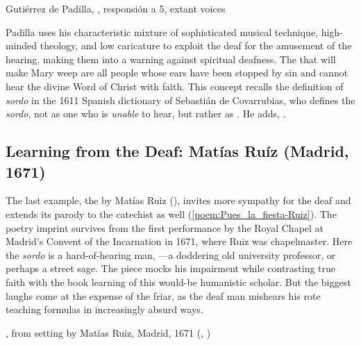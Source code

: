 \begin{musicexample}
    \caption{Gutiérrez de Padilla, ,
    responsión a 5, extant voices}

    \label{music:Padilla-Sordo-responsion}

\end{musicexample}

Padilla uses his characteristic mixture of sophisticated musical technique,
high-minded theology, and low caricature to exploit the deaf for the amusement
of the hearing, making them into a warning against spiritual deafness.
The  that will make Mary weep are all people whose ears have
been stopped by sin and cannot hear the divine Word of Christ with faith.
This concept recalls the definition of \emph{sordo} in the 1611 Spanish
dictionary of Sebastián de Covarrubias, who defines the \emph{sordo}, not as one
who is \emph{unable} to hear, but rather as .
He adds, .%
    \Autocite
    [: .] 
    {Covarrubias:Tesoro}


\subsection{Learning from the Deaf: Matías Ruíz (Madrid, 1671)}

The last example, the  by Matías Ruiz
(), invites more sympathy for the deaf and extends its
parody to the catechist as well (\cref{poem:Pues_la_fiesta-Ruiz}).
The poetry imprint survives from the first performance by the Royal Chapel at
Madrid's Convent of the Incarnation in 1671, where Ruiz was chapelmaster.%
   \Autocites{1671-Madrid-Enc-Nav}{Grove:Ruiz}
Here the \emph{sordo} is a hard-of-hearing man, ---a doddering old university professor, or perhaps a street sage.
The piece mocks his impairment while contrasting true faith with the book
learning of this would-be humanistic scholar.
But the biggest laughs come at the expense of the friar, as the deaf man
mishears his rote teaching formulas in increasingly absurd ways.

\begin{poemexample}
    \caption{,
    from setting by Matías Ruiz, Madrid, 1671 (,
    )}

    \label{poem:Pues_la_fiesta-Ruiz}

\end{poemexample}

